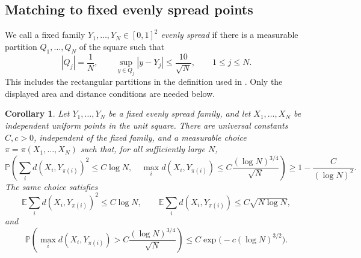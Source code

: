 \documentclass[11pt]{article}
\newcommand{\Pbb}{\mathbb P}
\newcommand{\Ebb}{\mathbb E}
\newtheorem{corollary}[theorem]{Corollary}
\theoremstyle{remark}
\numberwithin{equation}{section}
\begin{document}
\subsection{Matching to fixed evenly spread points}

We call a fixed family \(Y_1,\ldots,Y_N\in[0,1]^2\)
\emph{evenly spread} if there is a measurable partition
\(Q_1,\ldots,Q_N\) of the square such that
\[
 |Q_j|=\frac1N,\qquad
 \sup_{y\in Q_j}|y-Y_j|\le\frac{10}{\sqrt N},
 \qquad 1\le j\le N.
\]
This includes the rectangular partitions in the definition used in
\cite[\S4.3]{Tal21}. Only the displayed area and distance conditions
are needed below.

\begin{corollary}
\label{cor:grid}
Let \(Y_1,\ldots,Y_N\) be a fixed evenly spread family, and let
\(X_1,\ldots,X_N\) be independent uniform points in the unit square.
There are universal constants \(C,c>0\), independent of the fixed
family, and a measurable choice \(\pi=\pi(X_1,\ldots,X_N)\) such
that, for all sufficiently large \(N\),
\[
 \Pbb\left(
  \sum_i d(X_i,Y_{\pi(i)})^2\le C\log N,
  \quad
  \max_i d(X_i,Y_{\pi(i)})
  \le C\frac{(\log N)^{3/4}}{\sqrt N}
 \right)
 \ge1-\frac{C}{(\log N)^2}.
\]
The same choice satisfies
\[
 \Ebb\sum_i d(X_i,Y_{\pi(i)})^2\le C\log N,
 \qquad
 \Ebb\sum_i d(X_i,Y_{\pi(i)})\le C\sqrt{N\log N},
\]
and
\[
 \Pbb\left(
  \max_i d(X_i,Y_{\pi(i)})>
  C\frac{(\log N)^{3/4}}{\sqrt N}
 \right)
 \le C\exp\bigl(-c(\log N)^{3/2}\bigr).
\]
\end{corollary}
\end{document}
